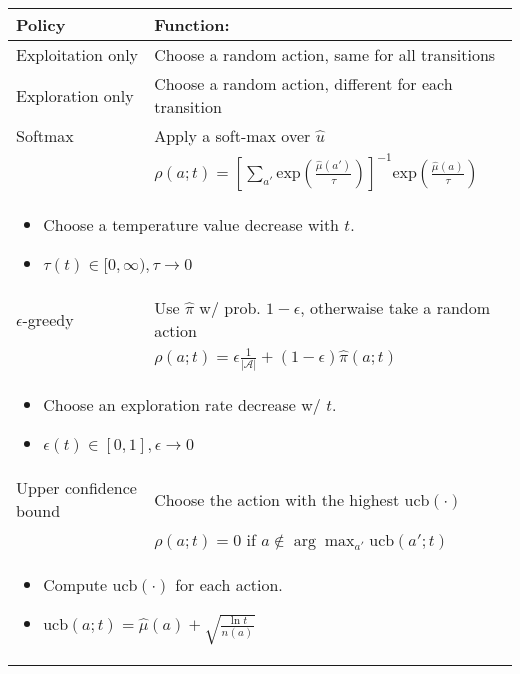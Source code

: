 \begin{summary}
    \begin{center}
        \begin{tabular}{ll}
            \toprule
            \textbf{Policy} & \textbf{Function:} \\
            \midrule
            Exploitation only & Choose a random action, same for all transitions \\
            \midrule
            Exploration only & Choose a random action, different for each transition \\ 
            \midrule
            Softmax & Apply a soft-max over $\hat{u}$ \\
            & $\rho(a;t) = \left[\sum_{a'} \text{exp}\left(\frac{\hat{\mu}(a')}{\tau}\right)\right]^{-1} \text{exp}\left(\frac{\hat{\mu}(a)}{\tau}\right)$ \\
            \multicolumn{2}{p{\linewidth}}{
            \begin{itemize}
                \item Choose a temperature value decrease with $t$. 
                \item $\tau(t) \in [0,\infty), \tau \rightarrow 0$
            \end{itemize}} \\
            \midrule
            $\epsilon$-greedy & Use $\hat{\pi}$ w/ prob. $1-\epsilon$, otherwaise take a random action \\
            & $\rho(a;t) = \epsilon \frac{1}{|\mathcal{A}|} + (1-\epsilon) \hat{\pi}(a;t)$ \\
            \multicolumn{2}{p{\linewidth}}{
            \begin{itemize}
                \item Choose an exploration rate decrease w/ $t$. 
                \item $\epsilon(t) \in [0,1], \epsilon \rightarrow 0$
            \end{itemize}} \\
            \midrule
            Upper confidence bound & Choose the action with the highest $\text{ucb}(\cdot)$\\ 
            & $\rho(a;t) = 0$ if $a \notin \arg \max_{a'} \text{ucb}(a';t)$ \\
            \multicolumn{2}{p{\linewidth}}{
            \begin{itemize}
                \item Compute $\text{ucb}(\cdot)$ for each action. 
                \item $\text{ucb}(a;t) = \hat{\mu}(a) + \sqrt{\frac{\ln t}{n(a)}}$
            \end{itemize}} \\
            \bottomrule            
        \end{tabular}
    \end{center}

\end{summary}
